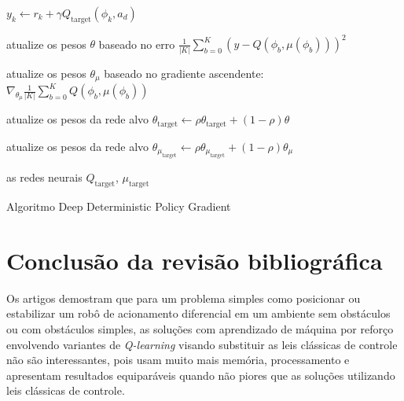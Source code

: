 \begin{algorithm}[H]
{{{{{                        $y_k \leftarrow r_k + \gamma Q_{\text{target}}(\phi_k,a_d)$
                      }
                    
                }

                atualize os pesos $\theta$ baseado no erro  $\frac{1}{|K|} \sum_{b =0}^{K} (y -Q(\phi_b,\mu(\phi_b)))^2$
                
                atualize os pesos $\theta_\mu$ baseado no gradiente ascendente:
                $\nabla_{\theta_\mu} \frac{1}{|K|} \sum_{b =0}^{K} Q(\phi_b,\mu(\phi_b))$
            
            }

           
        }

        atualize os pesos da rede alvo $\theta_{\text{target}}  \leftarrow \rho \theta_{\text{target}}  + (1-\rho) \theta$

        atualize os pesos da rede alvo $\theta_{\mu_{\text{target}}}  \leftarrow \rho \theta_{\mu_{\text{target}}}  + (1-\rho)\theta_\mu$

        
    }
    \Retorna as redes neurais $Q_{\text{target}}$, $\mu_{\text{target}}$
    \caption{Algoritmo Deep Deterministic Policy Gradient}
    \label{Deep Deterministic Policy Gradient:}
\end{algorithm}


\section{Conclusão da revisão bibliográfica}
Os artigos demostram que para um problema simples como posicionar ou estabilizar
um robô de acionamento diferencial em um ambiente sem obstáculos ou com
obstáculos simples, as soluções com aprendizado de máquina por reforço
envolvendo variantes de \textit{Q-learning} visando substituir as
leis clássicas de controle não são interessantes, pois usam muito mais
memória, processamento e apresentam resultados equiparáveis quando não
piores que as soluções utilizando leis clássicas de controle. 